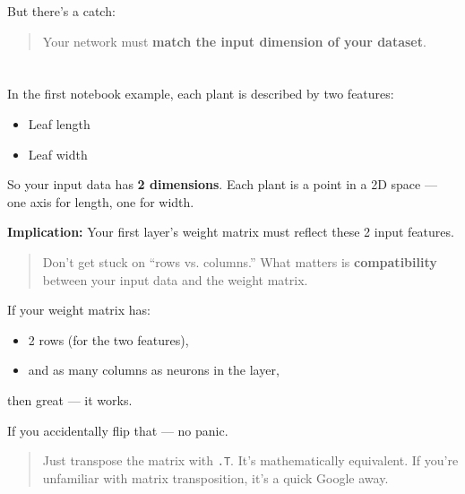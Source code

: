 \documentclass[11pt]{article}
\begin{document}
\vspace{1em}

But there’s a catch:

\begin{quote}
Your network must \textbf{match the input dimension of your dataset}.
\end{quote}

\vspace{1.5em}

\section*{}

In the first notebook example, each plant is described by two features:
\begin{itemize}
  \item Leaf length
  \item Leaf width
\end{itemize}

So your input data has \textbf{2 dimensions}.  
Each plant is a point in a 2D space — one axis for length, one for width.

\vspace{0.5em}

\textbf{Implication:}  
Your first layer’s weight matrix must reflect these 2 input features.

\vspace{1em}

\begin{quote}
Don’t get stuck on “rows vs. columns.”  
What matters is \textbf{compatibility} between your input data and the weight matrix.
\end{quote}

If your weight matrix has:
\begin{itemize}
  \item 2 rows (for the two features),
  \item and as many columns as neurons in the layer,
\end{itemize}
then great — it works.

If you accidentally flip that — no panic.

\begin{quote}
Just transpose the matrix with \texttt{.T}. It’s mathematically equivalent.  
If you’re unfamiliar with matrix transposition, it’s a quick Google away.
\end{quote}

\vspace{1em}
\end{document}
